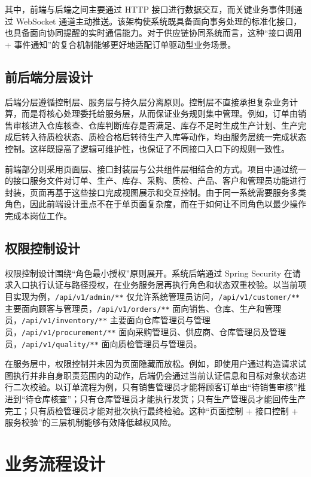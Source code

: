 其中，前端与后端之间主要通过 HTTP 接口进行数据交互，而关键业务事件则通过 WebSocket 通道主动推送。该架构使系统既具备面向事务处理的标准化接口，也具备面向协同提醒的实时通信能力。对于供应链协同系统而言，这种“接口调用 + 事件通知”的复合机制能够更好地适配订单驱动型业务场景。

\subsection{前后端分层设计}

后端分层遵循控制层、服务层与持久层分离原则。控制层不直接承担复杂业务计算，而是将核心处理委托给服务层，从而保证业务规则集中管理。例如，订单由销售审核进入仓库核查、仓库判断库存是否满足、库存不足时生成生产计划、生产完成后转入待质检状态、质检合格后转待生产入库等动作，均由服务层统一完成状态控制。这样既提高了逻辑可维护性，也保证了不同接口入口下的规则一致性。

前端部分则采用页面层、接口封装层与公共组件层相结合的方式。项目中通过统一的接口服务文件对订单、生产、库存、采购、质检、产品、客户和管理员功能进行封装，页面再基于这些接口完成视图展示和交互控制。由于同一系统需要服务多类角色，因此前端设计重点不在于单页面复杂度，而在于如何让不同角色以最少操作完成本岗位工作。

\subsection{权限控制设计}

权限控制设计围绕“角色最小授权”原则展开。系统后端通过 Spring Security 在请求入口执行认证与路径授权，在业务服务层再执行角色和状态双重校验。以当前项目实现为例，\texttt{/api/v1/admin/**} 仅允许系统管理员访问，\texttt{/api/v1/customer/**} 主要面向顾客与管理员，\texttt{/api/v1/orders/**} 面向销售、仓库、生产和管理员，\texttt{/api/v1/inventory/**} 主要面向仓库管理员与管理员，\texttt{/api/v1/procurement/**} 面向采购管理员、供应商、仓库管理员及管理员，\texttt{/api/v1/quality/**} 面向质检管理员与管理员。

在服务层中，权限控制并未因为页面隐藏而放松。例如，即使用户通过构造请求试图执行并非自身职责范围内的动作，后端仍会通过当前认证信息和目标对象状态进行二次校验。以订单流程为例，只有销售管理员才能将顾客订单由“待销售审核”推进到“待仓库核查”；只有仓库管理员才能执行发货；只有生产管理员才能回传生产完工；只有质检管理员才能对批次执行最终检验。这种“页面控制 + 接口控制 + 服务校验”的三层机制能够有效降低越权风险。

\section{业务流程设计}

